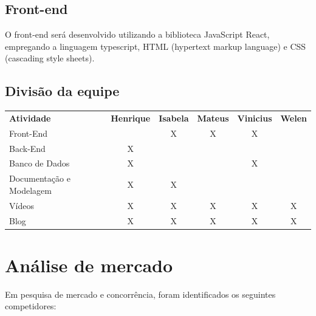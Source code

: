 \documentclass[
    12pt,               %
    openright,          %
    oneside,
    a4paper,            %
    MODELO,             %
    english,            %
    brazil              %
   ]{ifsp-spo-inf-ctds}
\begin{document}
\section{Front-end}

O front-end será desenvolvido utilizando a biblioteca JavaScript React, empregando a linguagem typescript, HTML (hypertext markup language) e CSS (cascading style sheets).

\section{Divisão da equipe}
    \begin{table}[h!]
	    \begin{tabular}{lccccc}
    		 \textbf{Atividade} & \textbf{Henrique} & \textbf{Isabela} & \textbf{Mateus} & \textbf{Vinicius} & \multicolumn{1}{c}{\textbf{Welen}} \\
    		 Front-End & \multicolumn{1}{l}{} & X & X & X & \\
    		 Back-End & X & \multicolumn{1}{l}{} & \multicolumn{1}{l}{} & \multicolumn{1}{l}{} & \\
    		 Banco de Dados & X & \multicolumn{1}{l}{} & \multicolumn{1}{l}{} & X & \\
    		 Documentação e Modelagem & X & X & \multicolumn{1}{l}{} & \multicolumn{1}{l}{} & \\
    		 Vídeos & X & X & X & X & \multicolumn{1}{c}{X} \\
    		 Blog & X & X & X & X & \multicolumn{1}{c}{X} 
	    \end{tabular}
    \end{table}
	
\chapter[Análise de mercado]{Análise de mercado}

    Em pesquisa de mercado e concorrência, foram identificados os seguintes competidores:
    
\end{document}
